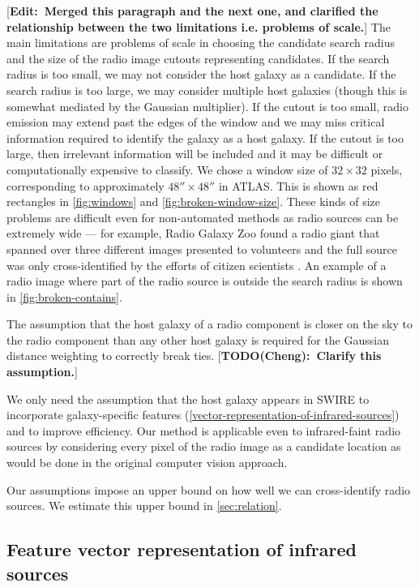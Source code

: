 \documentclass[fleqn,usenatbib,usedcolumn]{mnras}
\newcommand{\matthew}[2]{ {\color{white!20!violet}[{\bf TODO(#1):~{#2}}]} }
\newcommand{\edit}[1]{ {\color{red}[{\bf Edit:~{#1}}]} }
\begin{document}
    \edit{Merged this paragraph and the next one, and clarified the relationship between the two limitations i.e. problems of scale.} The main limitations are problems of scale in choosing the candidate search radius and the size of the radio image cutouts representing candidates. If the search radius is too small, we may not consider the host galaxy as a candidate. If the search radius is too large, we may consider multiple host galaxies (though this is somewhat mediated by the Gaussian multiplier). If the cutout is too small, radio emission may extend past the edges of the window and we may miss critical information required to identify the galaxy as a host galaxy. If the cutout is too large, then irrelevant information will be included and it may be difficult or computationally expensive to classify. We chose a window size of $32 \times 32$ pixels, corresponding to approximately $48'' \times 48''$ in ATLAS. This is shown as red rectangles in \autoref{fig:windows} and \autoref{fig:broken-window-size}. These kinds of size problems are difficult even for non-automated methods as radio sources can be extremely wide --- for example, Radio Galaxy Zoo found a radio giant that spanned over three different images presented to volunteers and the full source was only cross-identified by the efforts of citizen scientists \citep{banfield15}. An example of a radio image where part of the radio source is outside the search radius is shown in \autoref{fig:broken-contains}.

    The assumption that the host galaxy of a radio component is closer on the sky to the radio component than any other host galaxy is required for the Gaussian distance weighting to correctly break ties. \matthew{Cheng}{Clarify this assumption.}

    We only need the assumption that the host galaxy appears in SWIRE to
    incorporate galaxy-specific features
    (\autoref{vector-representation-of-infrared-sources}) and to improve
    efficiency. Our method is applicable even to infrared-faint radio sources
    by considering every pixel of the radio image as a candidate location as would be done in the
    original computer vision approach.

    Our assumptions impose an upper bound on how well we can cross-identify
    radio sources. We estimate this upper bound in \autoref{sec:relation}.

  \subsection{Feature vector representation of infrared sources}
  \label{vector-representation-of-infrared-sources}
\end{document}
